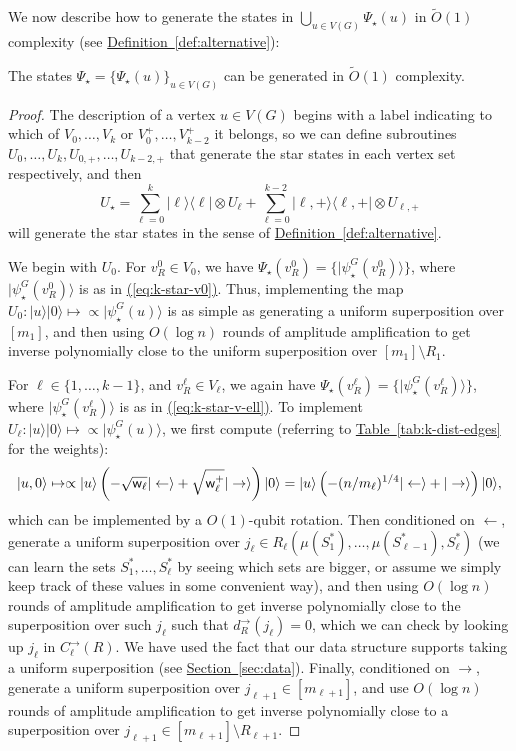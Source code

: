 \documentclass{theoretics}
\newcommand{\eq}[1]{\hyperref[eq:#1]{(\ref*{eq:#1})}}
\renewcommand{\sec}[1]{\hyperref[sec:#1]{Section~\ref*{sec:#1}}}
\newcommand{\tabl}[1]{\hyperref[tab:#1]{Table~\ref*{tab:#1}}}
\newcommand{\defin}[1]{\hyperref[def:#1]{Definition~\ref*{def:#1}}}
\def\ket#1{{\lvert}#1\rangle}
\def\bra#1{{\langle}#1\rvert}
\renewcommand{\>}{\rangle}
\newcommand{\<}{\langle}
\renewcommand{\(}{\left(}
\renewcommand{\)}{\right)}
\def\w{{\sf w}}
\begin{document}
\noindent We now describe how to generate the states in $\bigcup_{u\in V(G)}\Psi_\star(u)$ in $\widetilde{O}(1)$ complexity (see \defin{alternative}):
\begin{lemma}\label{lem:k-dist-star-states}
	The states $\Psi_\star=\{\Psi_\star(u)\}_{u\in V(G)}$ can be generated in $\widetilde{O}(1)$ complexity. 
\end{lemma}
\begin{proof}
The description of a vertex $u\in V(G)$ begins with a label indicating to which of $V_0,\dots,V_k$ or $V_0^+,\dots,V_{k-2}^+$ it belongs, so we can define subroutines $U_0,\dots,U_k,U_{0,+},\dots,U_{k-2,+}$ that generate the star states in each vertex set respectively, and then 
$$U_\star = \sum_{\ell=0}^k\ket{\ell}\bra{\ell}\otimes U_{\ell}+\sum_{\ell=0}^{k-2}\ket{\ell,+}\bra{\ell,+}\otimes U_{\ell,+}$$
will generate the star states in the sense of \defin{alternative}. 

	
	We begin with $U_0$. For $v^{0}_{R} \in V_0$, we have $\Psi_\star(v^0_R)=\{\ket{\psi_\star^G(v_R^0)}\}$, where $\ket{\psi_\star^G(v_R^0)}$ is as in \eq{k-star-v0}. Thus, implementing the map $U_0:\ket{u}\ket{0}\mapsto \propto \ket{\psi_\star^G(u)}$ is as simple as generating a uniform superposition over $[m_1]$, and then using $O(\log n)$ rounds of amplitude amplification to get inverse polynomially close to the uniform superposition over $[m_1]\setminus R_1$. 


For $\ell\in\{1,\dots,k-1\}$, and $v^{\ell}_R\in V_{\ell}$, we again have $\Psi_\star(v^\ell_R)=\{\ket{\psi_\star^G(v_R^\ell)}\}$, where $\ket{\psi_\star^G(v_R^\ell)}$ is as in \eq{k-star-v-ell}. To implement $U_{\ell}:\ket{u}\ket{0}\mapsto \propto\ket{\psi_\star^G(u)}$, we first compute (referring to \tabl{k-dist-edges} for the weights):
$$\ket{u,0}\mapsto \propto\ket{u}\left(-\sqrt{\w_{\ell}}\ket{\leftarrow}+\sqrt{\w_{\ell}^+}\ket{\rightarrow}\right)\ket{0}=\ket{u}\left(-(n/m_{\ell})^{1/4}\ket{\leftarrow}+\ket{\rightarrow}\right)\ket{0},$$
which can be implemented by a $O(1)$-qubit rotation. Then conditioned on $\leftarrow$, generate a uniform superposition over $j_{\ell}\in R_{\ell}(\mu(S_1^*),\dots,\mu(S_{\ell-1}^*),S_{\ell}^*)$ (we can learn the sets $S_1^*,\dots,S_{\ell}^*$ by seeing which sets are bigger, or assume we simply keep track of these values in some convenient way), and then using $O(\log n)$ rounds of amplitude amplification to get inverse polynomially close to the superposition over such $j_{\ell}$ such that $d_R^{\rightarrow}(j_{\ell})=0$, which we can check by looking up $j_{\ell}$ in $C_{\ell}^{\rightarrow}(R)$. We have used the fact that our data structure supports taking a uniform superposition (see \sec{data}). Finally, conditioned on $\rightarrow$, generate a uniform superposition over $j_{\ell+1}\in [m_{\ell+1}]$, and use $O(\log n)$ rounds of  amplitude amplification to get inverse polynomially close to a superposition over $j_{\ell+1}\in [m_{\ell+1}]\setminus R_{\ell+1}$.  


\end{proof}
\end{document}
